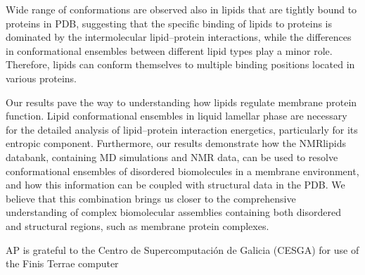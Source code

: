 \documentclass[aps,prl,superscriptaddress,twocolumn]{revtex4}
\begin{document}
Wide range of conformations are observed also in lipids that are tightly bound to proteins in PDB,
suggesting that the specific binding of lipids to proteins is dominated by the intermolecular lipid--protein
interactions, while the differences in conformational ensembles between different lipid types
play a minor role. Therefore, lipids can conform themselves to multiple binding positions located
in various proteins.

Our results pave the way to understanding how lipids regulate membrane protein function.
Lipid conformational ensembles in liquid lamellar phase are necessary
for the detailed analysis of lipid--protein interaction energetics, particularly for its entropic component. 
Furthermore, our results demonstrate how the NMRlipids databank, containing MD simulations and NMR data,
can be used to resolve conformational ensembles of disordered biomolecules in a membrane environment,
and how this information can be coupled with structural data in the PDB.
We believe that this combination brings us closer to the comprehensive understanding of
complex biomolecular assemblies containing both disordered and structural regions, such as membrane
protein complexes.

\begin{acknowledgments}
AP is grateful to the Centro de
Supercomputación de Galicia (CESGA) for use of the Finis
Terrae computer
\end{acknowledgments}





\listoftodos
\end{document}
